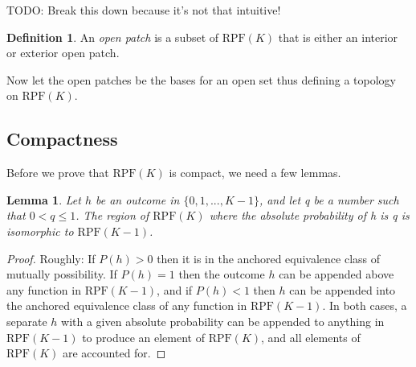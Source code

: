 \documentclass[twoside]{article}
\theoremstyle{plain}%
\newtheorem{lemma}[theorem]{Lemma}
\theoremstyle{definition}
\newtheorem{definition}{Definition}[section]
\theoremstyle{remark}
\begin{document}
\begin{figure}
{
}
\end{figure}

TODO: Break this down because it's not that intuitive!

\begin{definition}
An \textit{open patch} is a subset of \(\text{RPF}(K)\) that is either an interior or exterior open patch.
\end{definition}

Now let the open patches be the bases for an open set thus defining a topology on \(\text{RPF}(K)\).

\subsection{Compactness}

Before we prove that \(\text{RPF}(K)\) is compact, we need a few lemmas.

\begin{lemma}
Let \(h\) be an outcome in \(\{0, 1, ..., K-1\}\), and let q be a number such that \(0 < q \leq 1\). The region of \(\text{RPF}(K)\) where the absolute probability of h is q is isomorphic to \(\text{RPF}(K-1)\).
\end{lemma}

\begin{proof}
Roughly: If \(P(h) > 0\) then it is in the anchored equivalence class of mutually possibility. If \(P(h) = 1\) then the outcome \(h\) can be appended above any function in \(\text{RPF}(K - 1)\), and if \(P(h) < 1\) then \(h\) can be appended into the anchored equivalence class of any function in \(\text{RPF}(K-1)\). In both cases, a separate \(h\) with a given absolute probability can be appended to anything in \(\text{RPF}(K-1)\) to produce an element of \(\text{RPF}(K)\), and all elements of \(\text{RPF}(K)\) are accounted for.
\end{proof}
\end{document}
